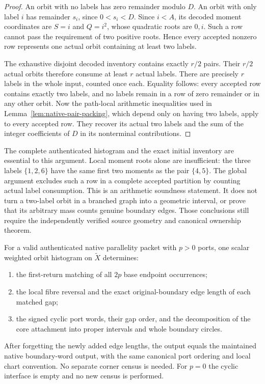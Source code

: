 \begin{proof}
An orbit with no labels has zero remainder modulo $D$.  An orbit with only
label $i$ has remainder $s_i$, since $0<s_i<D$.  Since $i<A$, its decoded
moment coordinates are $S=i$ and $Q=i^2$, whose quadratic roots are $0,i$.
Such a row cannot pass the requirement of two positive roots.  Hence every
accepted nonzero row represents one actual orbit containing at least two
labels.

The exhaustive disjoint decoded inventory contains exactly $r/2$ pairs.
Their $r/2$ actual orbits therefore consume at least $r$ actual labels.
There are precisely $r$ labels in the whole input, counted once each.
Equality follows: every accepted row contains exactly two labels, and no
labels remain in a row of zero remainder or in any other orbit.  Now the
path-local arithmetic inequalities used in
Lemma~\ref{lem:native-pair-packing}, which depend only on having two labels,
apply to every accepted row.  They recover its actual two labels and the
sum of the integer coefficients of $D$ in its nonterminal contributions.
\end{proof}

The complete authenticated histogram and the exact initial inventory are
essential to this argument.  Local moment roots alone are insufficient:
the three labels $\{1,2,6\}$ have the same first two moments as the pair
$\{4,5\}$.  The global argument excludes such a row in a complete accepted
partition by counting actual label consumption.  This is an arithmetic
soundness statement.  It does not turn a two-label orbit in a branched
graph into a geometric interval, or prove that its arbitrary mass counts
genuine boundary edges.  Those conclusions still require the independently
verified source geometry and canonical ownership theorem.

\begin{theorem}
\label{thm:native-moment-bridge}
For a valid authenticated native parallelity packet with $p>0$ ports,
one scalar weighted orbit histogram on $\widetilde X$ determines:
\begin{enumerate}
  \item the first-return matching of all $2p$ base endpoint occurrences;
  \item the local fibre reversal and the exact original-boundary edge
  length of each matched gap;
  \item the signed cyclic port words, their gap order, and the decomposition
  of the core attachment into proper intervals and whole boundary circles.
\end{enumerate}
After forgetting the newly added edge lengths, the output equals the
maintained native boundary-word output, with the same canonical port
ordering and local chart convention.  No separate corner census is needed.
For $p=0$ the cyclic interface is empty and no new census is performed.
\end{theorem}

